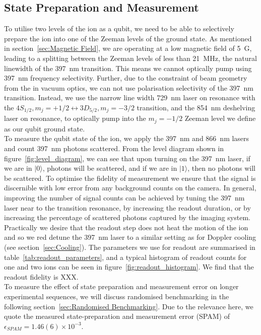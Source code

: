\documentclass[12pt]{report}
\begin{document}
\subsection{State Preparation and Measurement}
    To utilise two levels of the ion as a qubit, we need to be able to
    selectively prepare the ion into one of the Zeeman levels of the ground
    state. As mentioned in section~\ref{sec:Magnetic Field}, we are operating at
    a low magnetic field of 5~G, leading to a splitting between the Zeeman
    levels of less than 21~MHz, the natural linewidth of the 397~nm transition.
    This means we cannot optically pump using 397~nm frequency selectivity.
    Further, due to the constraint of beam geometry from the in vacuum optics,
    we can not use polarisation selectivity of the 397~nm transition. Instead,
    we use the narrow line width 729~nm laser on resonance with the $4S_{1/2},
    m_j = +1/2 \leftrightarrow 3D_{5/2}, m_j = -3/2$ transition, and the 854~nm
    deshelving laser on resonance, to optically pump into the $m_j = -1/2$
    Zeeman level we define as our qubit ground state. \\
    To measure the qubit state of the ion, we apply the 397~nm and 866~nm lasers
    and count 397~nm photons scattered. From the level diagram shown in
    figure~\ref{fig:level_diagram}, we can see that upon turning on the 397~nm
    laser, if we are in $|0\rangle$, photons will be scattered, and if we are in
    $|1\rangle$, then no photons will be scattered. To optimise the fidelity of
    measurement we ensure that the signal is discernible with low error from any
    background counts on the camera. In general, improving the number of signal
    counts can be achieved by tuning the 397~nm laser near to the transition
    resonance, by increasing the readout duration, or by increasing the
    percentage of scattered photons captured by the imaging system. Practically
    we desire that the readout step does not heat the motion of the ion and so
    we red detune the 397~nm laser to a similar setting as for Doppler cooling
    (see section~\ref{sec:Cooling}). The parameters we use for readout are
    summarised in table~\ref{tab:readout_parameters}, and a typical histogram of
    readout counts for one and two ions can be seen in
    figure~\ref{fig:readout_histogram}. We find that the readout fidelity is
    XXX.\\
    To measure the effect of state preparation and measurement error on longer
    experimental sequences, we will discuss randomised benchmarking in the following
    section~\ref{sec:Randomised Benchmarking}. Due to the relevance here, we
    quote the measured state-preparation and measurement error (SPAM) of $\epsilon_{SPAM} = 1.46(6) \times 10^{-3}$.\\
    
\end{document}
